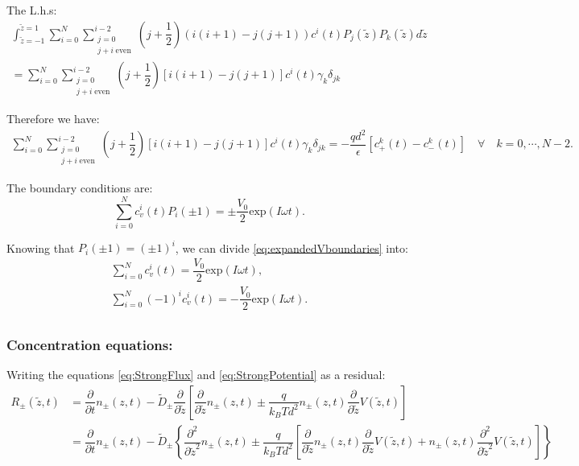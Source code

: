 \documentclass[amsmath,amsfonts,amssymb,superscriptaddress,showkeys,notitlepage,onecolumn]{revtex4-1}
\newcommand{\dpartial}[1]{\ensuremath{\dfrac{\partial}{\partial #1}}}
\newcommand{\ddpartial}[1]{\ensuremath{\dfrac{\partial^2}{\partial #1^2}}}
\newcommand{\zint}[1]{ \ensuremath{  \int_{\tilde{z}=-1}^{\tilde{z}=1} #1 d\tilde{z} } }
\newcommand{\Npm}{\ensuremath{n_{\pm}(z,t)}}
\newcommand{\legP}[1]{\ensuremath{P_{#1}(\tilde{z})}}
\begin{document}
The L.h.s:
\begin{align}\nonumber
  \zint{ \sum_{i=0}^{N} \sum_{\substack{j=0 \\  j+i \; \text{even}}}^{i-2}
  \left(j+\dfrac{1}{2} \right) \left(i(i+1)-j(j+1) \right) {c^i}(t)  \legP{j}
      P_k(\tilde{z})}  \\ \nonumber
  = \sum_{i=0}^{N} \sum_{\substack{j=0 \\  j+i \; \text{even}}}^{i-2}
  \left(j+\dfrac{1}{2} \right) \left[i(i+1)-j(j+1) \right] {c^i}(t)\gamma_k \delta_{jk}
\end{align}

Therefore we have:
\begin{align}
\sum_{i=0}^{N} \sum_{\substack{j=0 \\  j+i \; \text{even}}}^{i-2}
  \left(j+\dfrac{1}{2} \right) \left[i(i+1)-j(j+1) \right] {c^i}(t)\gamma_k \delta_{jk}=-\dfrac{q d^2}{\epsilon}  [c^k_{+}(t)  - c^k_{-}(t)] \quad \forall \quad k=0,\cdots, N-2.
\end{align}

The boundary conditions are:
\begin{equation}\label{eq:expandedVboundaries}
 \sum_{i=0}^N {c^i_{v}(t)} P_i(\pm 1)=\pm \dfrac{V_0}{2} \text{exp}(I \omega t).
\end{equation}

Knowing that $P_i(\pm 1)=(\pm 1)^i$, we can divide \eqref{eq:expandedVboundaries} into:
\begin{align}\nonumber
  \sum_{i=0}^N {c^i_{v}(t)}= \dfrac{V_0}{2} \text{exp}(I \omega t),\\
  \sum_{i=0}^N (-1)^i {c^i_{v}(t)}= -\dfrac{V_0}{2} \text{exp}(I \omega t).\\
\end{align}

\subsubsection{Concentration equations:}


Writing the equations \eqref{eq:StrongFlux} and \eqref{eq:StrongPotential} as a residual:
\begin{align}\label{eq:Residual}\nonumber
  R_{\pm}(\tilde{z},t)&= \dpartial{t} \Npm-\tilde{D}_\pm \dpartial{\tilde{z}}\left[\dpartial{\tilde{z}}\Npm \pm \dfrac{q}{k_B T d^2} \Npm \dpartial{\tilde{z}} V(\tilde{z},t) \right]\\
  &=\dpartial{t} \Npm-\tilde{D}_\pm\left\lbrace\ddpartial{\tilde{z}}\Npm \pm \dfrac{q}{k_B T d^2} \left[\dpartial{\tilde{z}} \Npm \dpartial{\tilde{z}} V(\tilde{z},t) + \Npm \ddpartial{\tilde{z}} V(\tilde{z},t)\right] \right\rbrace
\end{align}
\end{document}
